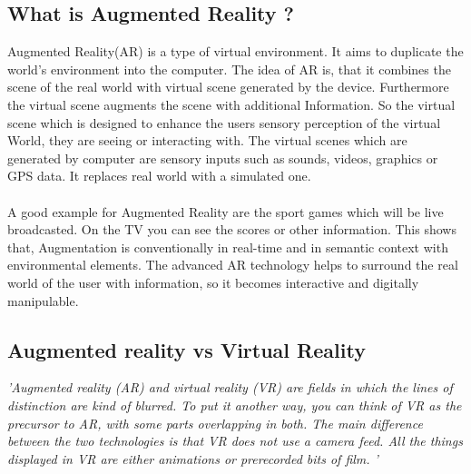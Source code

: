  \subsection{What is Augmented Reality ?}
  Augmented Reality(AR) is a type of  virtual environment. It aims to duplicate the world's environment into the computer. The idea of AR is, that it combines the scene of the real world with virtual scene generated by the device. Furthermore the virtual scene augments the scene with additional Information. So the virtual scene which is designed to enhance the users sensory perception of the virtual World, they are seeing or interacting with. The virtual scenes which are generated by computer are sensory inputs such as sounds, videos, graphics or GPS data. It replaces real world with a simulated one.\cite{augmenteddef}
 \\\\
 A good example for Augmented Reality are the sport games which will be live broadcasted. On the TV you can see the scores or other information. This shows that,  Augmentation is conventionally in real-time and in semantic context with environmental elements. The advanced AR technology helps to surround the real world of the user with information, so it becomes interactive and digitally manipulable.\cite{augmenteddef}
 \\
 \subsection{Augmented reality vs Virtual Reality}
 
 \textit{'Augmented reality (AR) and virtual reality (VR) are fields in which the lines of
 distinction are kind of blurred. To put it another way, you can think of VR as the
 precursor to AR, with some parts overlapping in both. The main difference
 between the two technologies is that VR does not use a camera feed. All the
 things displayed in VR are either animations or prerecorded bits of film.
 '\cite{AugmentedBook}}
